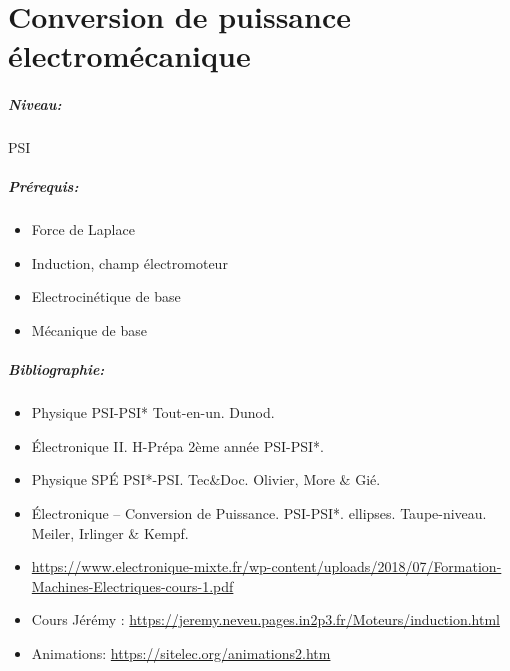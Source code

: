 \documentclass[11pt]{report}
\numberwithin{figure}{section}
\numberwithin{equation}{section}
\numberwithin{table}{section}
\newcommand{\1}{\boldsymbol{1}}
\begin{document}
\newpage




\chapter{Conversion de puissance électromécanique}

\paragraph*{Niveau:} PSI
\paragraph*{Prérequis:} 
\begin{itemize}
\item Force de Laplace
\item Induction, champ électromoteur
\item Electrocinétique de base
\item Mécanique de base
\end{itemize}

\paragraph*{Bibliographie:}
\begin{itemize}
\item Physique PSI-PSI* Tout-en-un. Dunod.
\item Électronique II. H-Prépa 2ème année PSI-PSI*.
\item Physique SP\'E PSI*-PSI. Tec\&Doc. Olivier, More \& Gié.
\item Électronique -- Conversion de Puissance. PSI-PSI*. ellipses. Taupe-niveau. Meiler, Irlinger \& Kempf.
\item \url{https://www.electronique-mixte.fr/wp-content/uploads/2018/07/Formation-Machines-Electriques-cours-1.pdf}
\item Cours Jérémy : \url{https://jeremy.neveu.pages.in2p3.fr/Moteurs/induction.html}
\item Animations: \url{https://sitelec.org/animations2.htm}
\end{itemize}
\end{document}
